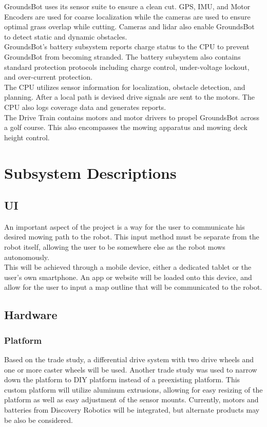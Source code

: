 \documentclass[12pt]{extarticle}
\begin{document}
  GroundsBot uses its sensor suite to ensure a clean cut. GPS, IMU, and Motor Encoders are used for coarse localization while the cameras are used to ensure optimal grass overlap while cutting.  Cameras and lidar also enable GroundsBot to detect static and dynamic obstacles.\\

  GroundsBot's battery subsystem reports charge status to the CPU to prevent GroundsBot from becoming stranded. The battery subsystem also contains standard protection protocols including charge control, under-voltage lockout, and over-current protection. \\

  The CPU utilizes sensor information for localization, obstacle detection, and planning.  After a local path is devised drive signals are sent to the motors. The CPU also logs coverage data and generates reports.\\

  The Drive Train contains motors and motor drivers to propel GroundsBot across a golf course.  This also encompasses the mowing apparatus and mowing deck height control. \\



\newpage
\section{Subsystem Descriptions}
	\subsection{UI}
	An important aspect of the project is a way for the user to communicate his desired mowing path to the robot. This input method must be separate from the robot itself, allowing the user to be somewhere else as the robot mows autonomously. \\
	
	This will be achieved through a mobile device, either a dedicated tablet or the user's own smartphone. An app or website will be loaded onto this device, and allow for the user to input a map outline that will be communicated to the robot. 
	
	\subsection{Hardware}
		\subsubsection{Platform}
			Based on the trade study, a differential drive system with two drive wheels and one or more caster wheels will be used. Another trade study was used to narrow down the platform to DIY platform instead of a preexisting platform. This custom platform will utilize aluminum extrusions, allowing for easy resizing of the platform as well as easy adjustment of the sensor mounts. Currently, motors and batteries from Discovery Robotics will be integrated, but alternate products may be also be considered. 
			
\end{document}

